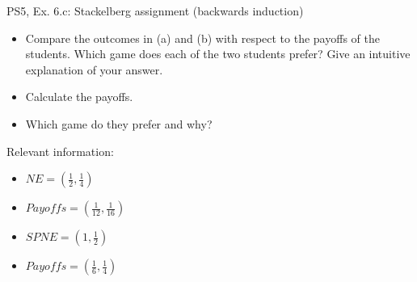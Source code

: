 \begin{frame}{PS5, Ex. 6.c: Stackelberg assignment (backwards induction)}
  \begin{itemize}
    \item[(c)] Compare the outcomes in (a) and (b) with respect to the payoffs of the students. Which game does each of the two students prefer? Give an intuitive explanation of your answer.
  \end{itemize}
  \begin{multicols}{2}
    \begin{itemize}
        \item[(Step 1)] Calculate the payoffs.
        \item[(Step 2)] Which game do they prefer and why?
    \end{itemize}
    \vfill\null \columnbreak
    Relevant information:
    \begin{itemize}
        \item[(a)] \begin{math} NE=\left(\frac{1}{2},\frac{1}{4}\right)\end{math}
        \item[(a)] \begin{math} Payoffs=\left(\frac{1}{12},\frac{1}{16}\right)\end{math}
        \item[(b)] \begin{math} SPNE=\left(1,\frac{1}{2}\right)\end{math}
        \item[(b)] \begin{math} Payoffs=\left(\frac{1}{6},\frac{1}{4}\right)\end{math}
    \end{itemize}
  \end{multicols}
\end{frame}
